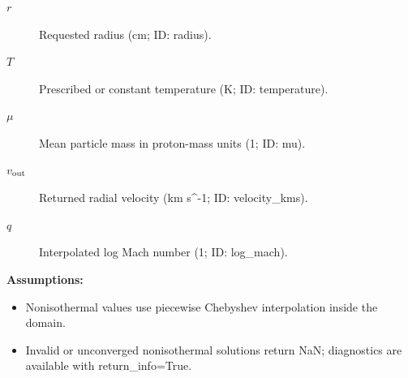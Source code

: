 \begin{description}
\item[$r$] Requested radius (cm; ID: radius).
\item[$T$] Prescribed or constant temperature (K; ID: temperature).
\item[$\mu$] Mean particle mass in proton-mass units (1; ID: mu).
\item[$v_{\rm out}$] Returned radial velocity (km s\textasciicircum{}-1; ID: velocity\_kms).
\item[$q$] Interpolated log Mach number (1; ID: log\_mach).
\end{description}

\noindent\textbf{Assumptions:}
\begin{itemize}
\item Nonisothermal values use piecewise Chebyshev interpolation inside the domain.
\item Invalid or unconverged nonisothermal solutions return NaN; diagnostics are available with return\_info=True.
\end{itemize}
